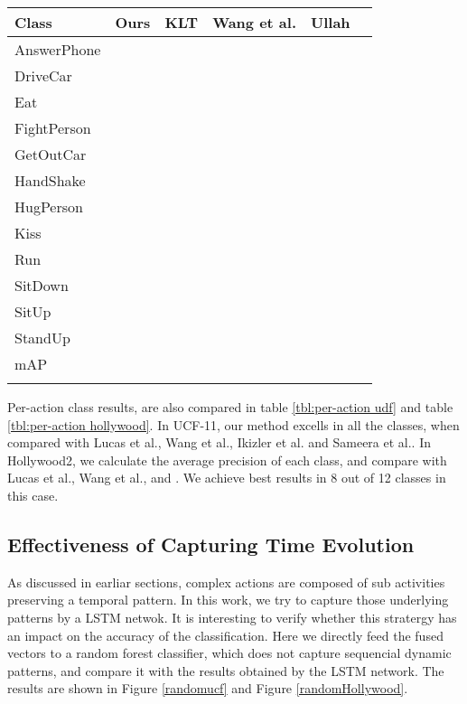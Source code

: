 \begin{table*}[]
\centering

\begin{tabular}{|l|l|l|l|l|l|}
\hline
Class            & Ours & KLT\cite{lucas1981iterative} & Wang et al.\cite{wang2011action} & Ullah\cite{ullah2010improving}   \\ \hline \hline
AnswerPhone       &     &     &     &         \\ 
DriveCar           &     &     &     &      \\ 
Eat           &     &     &     &          \\
FightPerson         &     &     &     &          \\ 
GetOutCar       &     &     &     &        \\ 
HandShake        &     &     &     &          \\ 
HugPerson       &     &     &     &          \\ 
Kiss        &     &     &     &          \\ 
Run        &     &     &     &          \\ 
SitDown           &     &     &     &          \\ 
SitUp           &     &     &     &          \\ 
StandUp           &     &     &     &          \\ \hline
mAP          &     &     &     &          \\ \hline
\label{tbl:per-action hollywood}
\end{tabular}
\caption{Per-class mAP comparison with state-of-the-art on Hollywood2.}
\end{table*}




Per-action class results, are also compared in table \ref{tbl:per-action udf} and table \ref{tbl:per-action hollywood}. In UCF-11, our method excells
in all the classes, when compared with Lucas et al.\cite{lucas1981iterative}, Wang et al.\cite{wang2011action}, Ikizler et al.\cite{ikizler2010object}
and Sameera et al.\cite{7486474}. In Hollywood2,
we calculate the average precision of each class, and compare with Lucas et al.\cite{lucas1981iterative}, Wang et al.\cite{wang2011action}, and \cite{}.
We achieve best results in 8 out of 12 classes in this case. 






\subsection{Effectiveness of Capturing Time Evolution}
As discussed in earliar sections, complex actions are composed of sub activities preserving
a temporal pattern. In this work, we try to capture those underlying patterns by a LSTM netwok.
It is interesting to verify whether this stratergy has an impact on the accuracy of the 
classification. Here we directly feed the fused vectors to a random forest classifier, which
does not capture sequencial dynamic patterns, and compare it with the results obtained by
the LSTM network. The results are shown in Figure \ref{randomucf} and Figure \ref{randomHollywood}.


